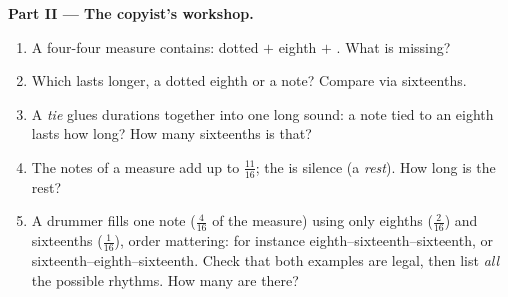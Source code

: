 \begin{problem}
\medskip
\noindent\textbf{Part II --- The copyist's workshop.}
\begin{enumerate}[resume]
  \item A four-four measure contains: dotted  $+$ eighth
        $+$ . What is missing?
  \item Which lasts longer, a dotted eighth or a  note?
        Compare via sixteenths.
  \item A \emph{tie} glues durations together into one long
        sound: a  note tied to an eighth lasts how long? How
        many sixteenths is that?
  \item The notes of a measure add up to $\frac{11}{16}$; the
         is silence (a \emph{rest}). How long is the
        rest?
  \item A drummer fills one  note ($\frac{4}{16}$ of the
        measure) using only eighths ($\frac{2}{16}$) and
        sixteenths ($\frac{1}{16}$), order mattering: for
        instance eighth--sixteenth--sixteenth, or
        sixteenth--eighth--sixteenth. Check that both examples
        are legal, then list \emph{all} the possible rhythms.
        How many are there?
\end{enumerate}


\end{problem}
